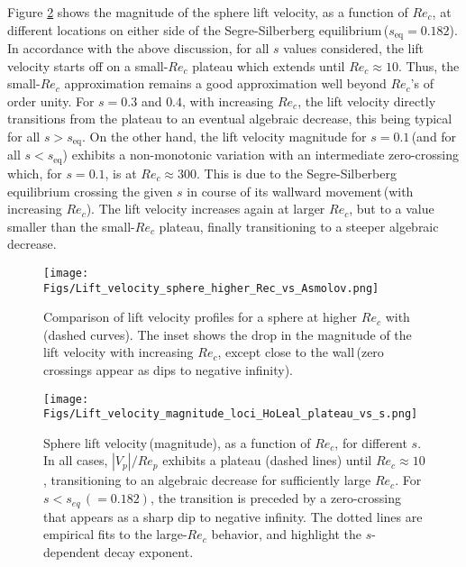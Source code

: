 \documentclass{jfm}
\begin{document}
Figure \ref{fig:Ch3HoLealplateau} shows the magnitude of the sphere lift velocity, as a function of $Re_c$, at different locations on either side of the Segre-Silberberg equilibrium\,($s_\text{eq} = 0.182$). In accordance with the above discussion, for all $s$ values considered, the lift velocity starts off on a small-$Re_c$ plateau which extends until $Re_c \approx 10$. Thus, the small-$Re_c$ approximation remains a good approximation well beyond $Re_c$'s of order unity. For $s=0.3$ and $0.4$, with increasing $Re_c$, the lift velocity directly transitions from the plateau to an eventual algebraic decrease, this being typical for all $s>s_\text{eq}$. On the other hand, the lift velocity magnitude for $s=0.1$\,(and for all $s<s_\text{eq}$) exhibits a non-monotonic variation with an intermediate zero-crossing which, for $s=0.1$, is at $Re_c \approx 300$. This is due to the Segre-Silberberg equilibrium crossing the given $s$ in course of its wallward movement\,(with increasing $Re_c$). The lift velocity increases  again at larger $Re_c$, but to a value smaller than the small-$Re_c$ plateau, finally transitioning to a steeper algebraic decrease.
\begin{figure}
	\centering
	\texttt{[image: Figs/Lift\_velocity\_sphere\_higher\_Rec\_vs\_Asmolov.png]}
	\caption{Comparison of lift velocity profiles for a sphere at higher $Re_c$ with \cite{asmolov1999}\,(dashed curves). The inset shows the drop in the magnitude of the lift velocity with increasing $Re_c$, except close to the wall\,(zero crossings appear as dips to negative infinity).}
	\label{fig:Ch3vsAsmolov}
\end{figure} 
\begin{figure}
	\centering
	\texttt{[image: Figs/Lift\_velocity\_magnitude\_loci\_HoLeal\_plateau\_vs\_s.png]}
	\caption{Sphere lift velocity\,(magnitude), as a function of $Re_c$, for different $s$. In all cases, $|V_p|/Re_p$ exhibits a plateau (dashed lines) until $Re_c \approx 10$, transitioning to an  algebraic decrease for sufficiently large $Re_c$. For $s < s_{eq}\,(=0.182)$, the transition is preceded by a zero-crossing that appears as a sharp dip to negative infinity. The dotted lines are empirical fits to the large-$Re_c$ behavior, and highlight the $s$-dependent decay exponent.}
	\label{fig:Ch3HoLealplateau}
\end{figure}
\end{document}
